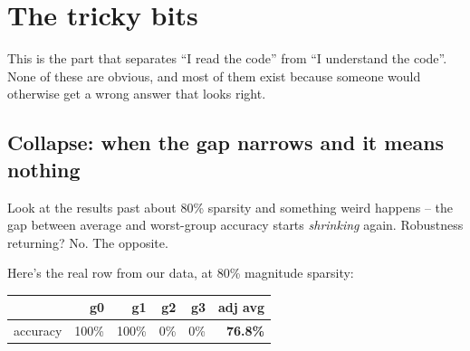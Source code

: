 \documentclass[11pt]{article}
\newcommand{\code}[1]{\texttt{\small #1}}
\begin{document}
\section{The tricky bits}\label{sec:tricky}

This is the part that separates ``I read the code'' from ``I understand the
code''. None of these are obvious, and most of them exist because someone
would otherwise get a wrong answer that looks right.

\subsection{Collapse: when the gap narrows and it means nothing}

Look at the results past about 80\% sparsity and something weird happens -- the
gap between average and worst-group accuracy starts \emph{shrinking} again.
Robustness returning? No. The opposite.

\begin{center}
\end{center}

\noindent Here's the real row from our data, at 80\% magnitude sparsity:

\begin{center}
\begin{tabular}{@{}lrrrrr@{}}
\toprule
 & \textbf{g0} & \textbf{g1} & \textbf{g2} & \textbf{g3} & \textbf{adj avg} \\
\midrule
accuracy & 100\% & 100\% & 0\% & 0\% & \textbf{76.8\%} \\
\bottomrule
\end{tabular}
\end{center}
\end{document}
